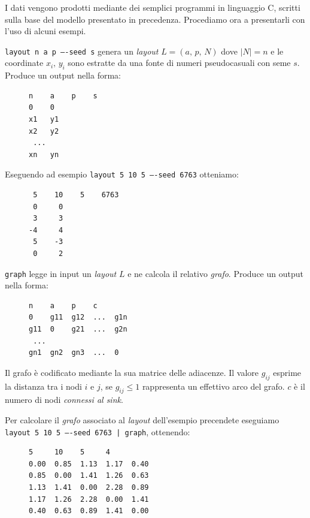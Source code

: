 \documentclass[a4paper,12pt]{article}
\theoremstyle{definition}
\begin{document}
I dati vengono prodotti mediante dei semplici programmi in linguaggio C, scritti sulla base del modello presentato in precedenza. Procediamo ora a presentarli con l'uso di alcuni esempi.

\texttt{layout n a p ----seed s} genera un \emph{layout} $L = (a,\,p,\,N)$ dove $|N| = n$ e le coordinate $x_i,\,y_i$ sono estratte da una fonte di numeri pseudocasuali con seme $s$. Produce un output nella forma:

\begin{figure}[H]
\centering
\begin{BVerbatim}
n    a    p    s
0    0
x1   y1
x2   y2
 ...
xn   yn
\end{BVerbatim}
\end{figure}

Eseguendo ad esempio \texttt{layout 5 10 5 ----seed 6763} otteniamo:

\begin{figure}[H]
\centering
\begin{BVerbatim}
 5    10    5    6763
 0     0
 3     3
-4     4
 5    -3
 0     2
\end{BVerbatim}
\end{figure}

\texttt{graph} legge in input un \emph{layout} $L$ e ne calcola il relativo \emph{grafo}. Produce un output nella forma:

\begin{figure}[H]
\centering
\begin{BVerbatim}
n    a    p    c
0    g11  g12  ...  g1n
g11  0    g21  ...  g2n
 ...
gn1  gn2  gn3  ...  0
\end{BVerbatim}
\end{figure}

Il grafo è codificato mediante la sua matrice delle adiacenze. Il valore $g_{ij}$ esprime la distanza tra i nodi $i$ e $j$, se $g_{ij} \leq 1$ rappresenta un effettivo arco del grafo. $c$ è il numero di nodi \emph{connessi al sink}.

Per calcolare il \emph{grafo} associato al \emph{layout} dell'esempio precendete eseguiamo \texttt{layout 5 10 5 ----seed 6763 | graph}, ottenendo:

\begin{figure}[H]
\centering
\begin{BVerbatim}
5     10    5     4
0.00  0.85  1.13  1.17  0.40
0.85  0.00  1.41  1.26  0.63
1.13  1.41  0.00  2.28  0.89
1.17  1.26  2.28  0.00  1.41
0.40  0.63  0.89  1.41  0.00
\end{BVerbatim}
\end{figure}
\end{document}
